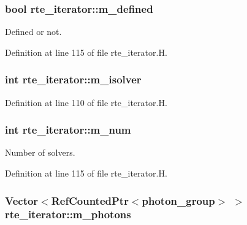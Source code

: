 \subsubsection[{\texorpdfstring{m\+\_\+defined}{m_defined}}]{\setlength{\rightskip}{0pt plus 5cm}bool rte\+\_\+iterator\+::m\+\_\+defined\hspace{0.3cm}{\ttfamily [protected]}}\hypertarget{classrte__iterator_a833f9ee5fcacd8892fb4bf30471c36e5}{}\label{classrte__iterator_a833f9ee5fcacd8892fb4bf30471c36e5}


Defined or not. 



Definition at line 115 of file rte\+\_\+iterator.\+H.

\subsubsection[{\texorpdfstring{m\+\_\+isolver}{m_isolver}}]{\setlength{\rightskip}{0pt plus 5cm}int rte\+\_\+iterator\+::m\+\_\+isolver\hspace{0.3cm}{\ttfamily [protected]}}\hypertarget{classrte__iterator_a726e2877a36971beb8940c8ed8d62452}{}\label{classrte__iterator_a726e2877a36971beb8940c8ed8d62452}


Definition at line 110 of file rte\+\_\+iterator.\+H.

\subsubsection[{\texorpdfstring{m\+\_\+num}{m_num}}]{\setlength{\rightskip}{0pt plus 5cm}int rte\+\_\+iterator\+::m\+\_\+num\hspace{0.3cm}{\ttfamily [protected]}}\hypertarget{classrte__iterator_a6bb36bf3c9c2b9249917218857918aa3}{}\label{classrte__iterator_a6bb36bf3c9c2b9249917218857918aa3}


Number of solvers. 



Definition at line 115 of file rte\+\_\+iterator.\+H.

\subsubsection[{\texorpdfstring{m\+\_\+photons}{m_photons}}]{\setlength{\rightskip}{0pt plus 5cm}Vector$<$Ref\+Counted\+Ptr$<${\bf photon\+\_\+group}$>$ $>$ rte\+\_\+iterator\+::m\+\_\+photons\hspace{0.3cm}{\ttfamily [protected]}}\hypertarget{classrte__iterator_a1f53fbecae6089bf284cf7479057b229}{}\label{classrte__iterator_a1f53fbecae6089bf284cf7479057b229}



